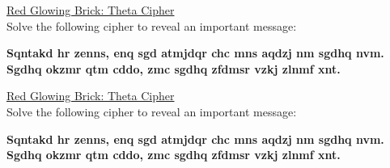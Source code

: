 \documentclass[white]{GL2020}
\begin{document}
\name{\wCipherTheta{}}

\vspace*{0.5cm}
\begin{center}
{\LARGE \underline{Red Glowing Brick: Theta Cipher}}\\
\vspace{0.5cm}
Solve the following cipher to reveal an important message:

\textbf{Sqntakd hr zenns, enq sgd atmjdqr chc mns aqdzj nm sgdhq nvm. Sgdhq okzmr qtm cddo, zmc sgdhq zfdmsr vzkj zlnmf xnt.}

\vspace{8cm}
{\LARGE \underline{Red Glowing Brick: Theta Cipher}}\\
\vspace{0.5cm}
Solve the following cipher to reveal an important message:

\textbf{Sqntakd hr zenns, enq sgd atmjdqr chc mns aqdzj nm sgdhq nvm. Sgdhq okzmr qtm cddo, zmc sgdhq zfdmsr vzkj zlnmf xnt.}

\end{center}
\end{document}
